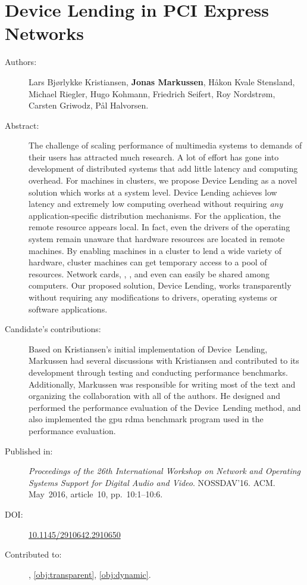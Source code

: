 \chapter{Device Lending in PCI Express Networks}
\label{paper:nossdav}
\paperthumb

\begin{description}
	\item[Authors:]
		Lars Bj{\o}rlykke Kristiansen, \textbf{Jonas Markussen}, H{\aa}kon Kvale Stensland,
		Michael Riegler, Hugo Kohmann, Friedrich Seifert, Roy Nordstr{\o}m, Carsten Griwodz, P{\aa}l Halvorsen.

	\item[Abstract:]
		The challenge of scaling  performance of multimedia systems to demands
		of their users has attracted much research.
		A lot of effort has gone into
		development of distributed systems that add little latency and computing overhead.
		For machines in  clusters,
		we propose Device Lending as a novel solution which works at a system
		level.
		Device Lending achieves low latency and extremely low computing overhead without
		requiring \textit{any} application-specific distribution mechanisms.
		For the application, the remote  resource appears local.
		In fact, even the drivers of the operating system remain unaware that
		hardware resources are located in remote machines.
		By enabling machines in a  cluster to lend a wide variety of hardware, 
		cluster machines can get temporary access to a pool of  resources. 
		Network cards, , , and even  can easily 
		be shared among computers.
		Our proposed solution, Device Lending, works transparently without requiring any modifications to drivers,
		operating systems or software applications.

	\item[Candidate's contributions:]
		Based on Kristiansen's initial implementation of Device~Lending, Markussen had several discussions with Kristiansen and contributed to its development through testing and conducting performance benchmarks.
		Additionally, Markussen was responsible for writing most of the text and organizing the collaboration with all of the authors.
		He designed and performed the performance evaluation of the Device~Lending method, and also implemented the \gls{gpu} \gls{rdma} benchmark program used in the performance evaluation.
		

	\item[Published in:]
		\emph{Proceedings of the 26th International Workshop on Network and Operating Systems Support for Digital Audio and Video}.
		NOSSDAV'16. ACM.
		May~2016, article~10, pp.~10:1--10:6.

	\item[DOI:] \href{https://doi.org/10.1145/2910642.2910650}{10.1145/2910642.2910650}

	\item[Contributed to:]
		, \cref{obj:transparent}, \cref{obj:dynamic}.

\end{description}

